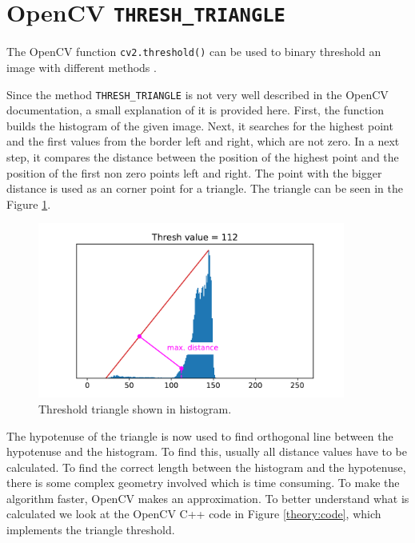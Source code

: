 \clearpage
\section{OpenCV \texttt{THRESH\_TRIANGLE}}
The OpenCV function \texttt{cv2.threshold()} can be used to binary threshold an image with different methods \cite{cv_thresh}.

Since the method \texttt{THRESH\_TRIANGLE} is not very well described in the OpenCV documentation, a small explanation of it is provided here. First, the function builds the histogram of the given image. Next, it searches for the highest point and the first values from the border left and right, which are not zero. In a next step, it compares the distance between the position of the highest point and the position of the first non zero points left and right. The point with the bigger distance is used as an corner point for a triangle. The triangle can be seen in the Figure \ref{theory:triangle}.
\begin{figure}[ht]
	\centering
	\includegraphics[width=0.9\textwidth]{2-theory/threshold/triangle.pdf}
	\caption{Threshold triangle shown in histogram.\label{theory:triangle}}
\end{figure} 
The hypotenuse of the triangle is now used to find orthogonal line between the hypotenuse and the histogram. To find this, usually all distance values have to be calculated. To find the correct length between the histogram and the hypotenuse, there is some complex geometry involved which is time consuming. To make the algorithm faster, OpenCV makes an approximation. To better understand what is calculated we look at the OpenCV C++ code in Figure \ref{theory:code}, which implements the triangle threshold. 
\clearpage
{}

